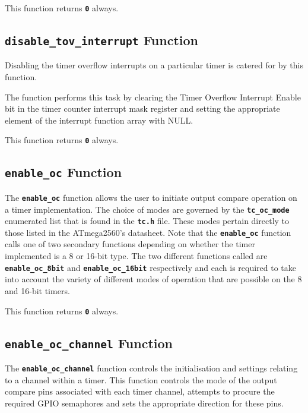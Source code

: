 \documentclass[a4paper, oneside, 11pt, titlepage, onecolumn, openright]{report}
\begin{document}
			This function returns \textbf{\texttt{0}} always.
			
\subsection{\textbf{\texttt{disable\_tov\_interrupt}} Function}
			\label{ss:HALtcdisable_tov_interruptFunction}
			
 			Disabling the timer overflow interrupts on a particular timer is catered for by this function. 
 			
 			The function performs this task by clearing the Timer Overflow Interrupt Enable bit in the timer counter interrupt mask register and setting the appropriate element of the interrupt function array with NULL. 
			
			This function returns \textbf{\texttt{0}} always.
			
\subsection{\textbf{\texttt{enable\_oc}} Function}
			\label{ss:HALtcenable_ocFunction}
			
 			The \textbf{\texttt{enable\_oc}} function allows the user to initiate output compare operation on a timer implementation. The choice of modes are governed by the \textbf{\texttt{tc\_oc\_mode}} enumerated list that is found in the \textbf{\texttt{tc.h}} file. These modes pertain directly to those listed in the ATmega2560's datasheet.
 			Note that the \textbf{\texttt{enable\_oc}} function calls one of two secondary functions depending on whether the timer implemented is a 8 or 16-bit type. The two different functions called are \textbf{\texttt{enable\_oc\_8bit}} and \textbf{\texttt{enable\_oc\_16bit}} respectively and each is required to take into account the variety of different modes of operation that are possible on the 8 and 16-bit timers.
			
			This function returns \textbf{\texttt{0}} always.

\subsection{\textbf{\texttt{enable\_oc\_channel}} Function}
			\label{ss:HALtcenable_oc_channelFunction}
			
			The \textbf{\texttt{enable\_oc\_channel}} function controls the initialisation and settings relating to a channel within a timer. This function controls the mode of the output compare pins associated with each timer channel, attempts to procure the required GPIO semaphores and sets the appropriate direction for these pins.
			
\end{document}

